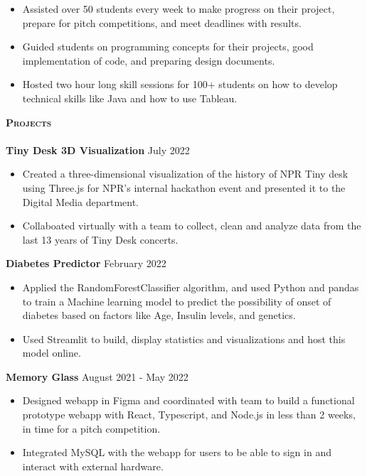 \documentclass[10pt, a4paper]{article}
\newcommand{\lineunder} {
    \vspace*{-8pt} \\
    \hspace*{-18pt} \hrulefill \\
}
\newcommand{\header} [1] {
    {\hspace*{-15pt}\vspace*{3pt} \textsc{#1}}
    \vspace*{-6pt} \lineunder
}
\begin{document}
{    \begin{itemize}
        \vspace{-2mm}
        \itemsep-0.05em
        \item Assisted over 50 students every week to make progress on their project, prepare for pitch competitions, and meet deadlines with results. 
        \item Guided students on programming concepts for their projects, good implementation of code, and preparing design documents.
        \item Hosted two hour long skill sessions for 100+ students on how to develop technical skills like Java and how to use Tableau.
    \end{itemize}


\header{\textbf{Projects}}
\textbf{Tiny Desk 3D Visualization}
\hfill July 2022\\
\vspace{-2mm}
\begin{itemize}
    \itemsep-0.05em
    \item Created a three-dimensional visualization of the history of NPR Tiny desk using Three.js for NPR's internal hackathon event and presented it to the Digital Media department. 
    \item Collaboated virtually with a team to collect, clean and analyze data from the last 13 years of Tiny Desk concerts.
\end{itemize}
\textbf{Diabetes Predictor}
\hfill February 2022\\
\vspace{-2mm}
\begin{itemize}
    \itemsep-0.05em
    \item Applied the RandomForestClassifier algorithm, and used Python and pandas to train a Machine learning model to predict the possibility of onset of diabetes based on factors like Age, Insulin levels, and genetics.
    \item Used Streamlit to build, display statistics and visualizations and host this model online. 
\end{itemize}
\textbf{Memory Glass}
\hfill August 2021 - May 2022\\
\vspace{-2mm}
\begin{itemize}
    \itemsep-0.05em
    \item Designed webapp in Figma and coordinated with team to build a functional prototype webapp with React, Typescript, and Node.js in less than 2 weeks, in time for a pitch competition. 
    \item Integrated MySQL with the webapp for users to be able to sign in and interact with external hardware.
    

\end{itemize}}
\end{document}
